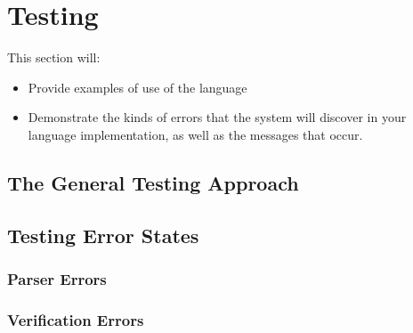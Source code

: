 
\chapter{Testing} %
\label{cha:testing}
This section will:
\begin{itemize}
    \item Provide examples of use of the language
    \item Demonstrate the kinds of errors that the system will discover in your language implementation, as well as the messages that occur. 
\end{itemize}

\section{The General Testing Approach} %
\label{sec:the_general_testing_approach}



\section{Testing Error States} %
\label{sec:testing_error_states}

\subsection{Parser Errors} %
\label{sub:parser_errors}


\subsection{Verification Errors} %
\label{sub:verification_errors}


